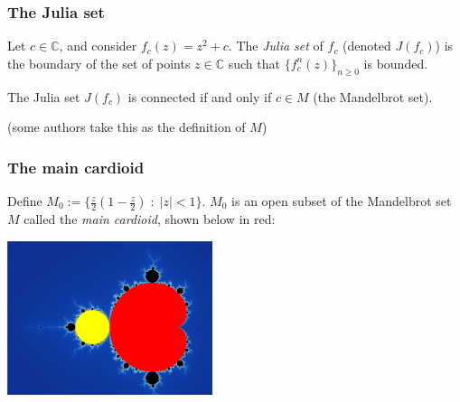 \documentclass{beamer} %
\theoremstyle{definition} %
\newcommand{\Cplx}{\mathbb{C}}
\begin{document}
\begin{frame}\frametitle{The Julia set}
    Let $c \in \Cplx$, and consider $f_c(z) = z^2+c$. The \emph{Julia set} of $f_c$ (denoted $J(f_c)$) is the boundary
    of the set of points $z \in \Cplx$ such that $\{f_c^n(z)\}_{n\geq 0}$ is bounded.
    \begin{theorem}[Mandelbrot]
        The Julia set $J(f_c)$ is connected if and only if $c \in M$ (the Mandelbrot set).
    \end{theorem}
    (some authors take this as the definition of $M$)
\end{frame}
% 
%     
% 
%     
%     
%     
%         
%         

\begin{frame}\frametitle{The main cardioid}
    
    Define $M_0 := \{\frac{z}{2}(1-\frac{z}{2})\;:\;|z|<1\}$. $M_0$ is 
    an open subset of the Mandelbrot set $M$ called the \emph{main cardioid}, shown below in red:
    \begin{center}
        \includegraphics[width=60mm]{img/main-cardioid.png}
    \end{center}
\end{frame}
\end{document}
